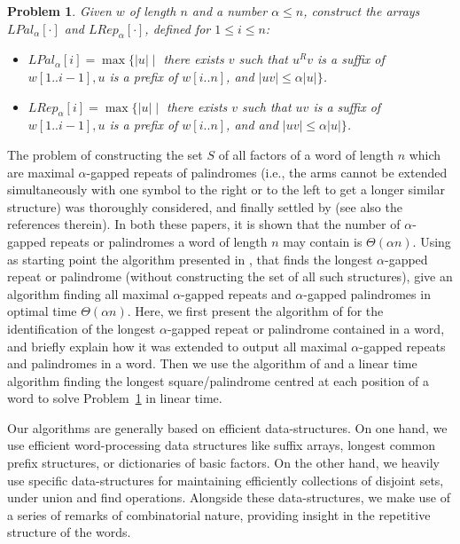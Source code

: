 \documentclass[final]{dmtcs-episciences}
\newcommand{\LP}{{\mathit{LPal}}_\alpha}
\newcommand{\LR}{{\mathit{LRep}}_\alpha}
\newtheorem{problem}{Problem}
\begin{document}
\begin{problem}\label{LLAP}
Given  $w$ of length $n$ and a number $\alpha\leq n$, construct the arrays $\LP[\cdot]$ and $\LR[\cdot]$, defined for $1\leq i\leq n$:
\begin{itemize}
\item[a.]$\LP[i]=\max\{|u|\mid$ there exists $v$ such that $u^Rv$ is a suffix of $w[1..i-1], u$ is a prefix of $w[i..n]$, and $|uv|\leq \alpha |u|\}$.
\item[b.]$\LR[i]=\max\{|u|\mid$ there exists $v$ such that $uv$ is a suffix of $w[1..i-1], u$ is a prefix of $w[i..n]$, and and $|uv|\leq \alpha |u|\}$.
\end{itemize}
\end{problem}

The problem of constructing the set $S$ of all factors of a word of length $n$ which are maximal $\alpha$-gapped repeats of palindromes (i.e., the arms cannot be extended simultaneously with one symbol to the right or to the left to get a longer similar structure) was thoroughly considered, and finally settled by \cite{CroKolKu2015,STACS2016} (see also the references therein). In both these papers, it is shown that the number of $\alpha$-gapped repeats or palindromes a word of length $n$ may contain is $\Theta(\alpha n)$. Using as starting point the algorithm presented in \cite{fct}, that finds the longest $\alpha$-gapped repeat or palindrome (without constructing the set of all such structures), \cite{STACS2016} give an algorithm finding all maximal $\alpha$-gapped repeats and $\alpha$-gapped palindromes in optimal time $\Theta(\alpha n)$.  Here, we first present the algorithm of \cite{fct} for the identification of the longest $\alpha$-gapped repeat or palindrome contained in a word, and briefly explain how it was extended to output all maximal $\alpha$-gapped repeats and palindromes in a word. Then we use the algorithm of \cite{STACS2016} and a linear time algorithm finding the longest square/palindrome centred at each position of a word to solve Problem~\ref{LLAP} in linear time. 

Our algorithms are generally based on efficient data-structures. On one hand, we use efficient word-processing data structures like suffix arrays, longest common prefix structures, or dictionaries of basic factors. On the other hand, we heavily use specific data-structures for maintaining efficiently collections of disjoint sets, under union and find ope\-rations. Alongside these data-structures, we make use of a series of remarks of combinatorial nature, providing insight in the repetitive structure of the words. 
\end{document}
